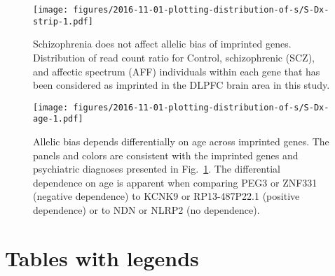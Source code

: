\documentclass[letterpaper]{article}
\begin{document}
\begin{figure}[H]
\begin{center}
\texttt{[image: figures/2016-11-01-plotting-distribution-of-s/S-Dx-strip-1.pdf]}
\caption{
Schizophrenia does not affect allelic bias of imprinted genes.
Distribution of read count ratio for Control, schizophrenic (SCZ), and
affectic spectrum (AFF) individuals within each gene that has been considered as imprinted in the DLPFC
brain area in this study.
}
\label{fig:S-Dx}
\end{center}
\end{figure}

\begin{figure}[H]
\begin{center}
\texttt{[image: figures/2016-11-01-plotting-distribution-of-s/S-Dx-age-1.pdf]}
\caption{
Allelic bias depends differentially on age across imprinted genes.
The panels and colors are consistent with the imprinted genes and psychiatric diagnoses
presented in Fig.~\ref{fig:S-Dx}.  The differential dependence on age is apparent
when comparing PEG3 or ZNF331 (negative dependence) to KCNK9 or RP13-487P22.1
(positive dependence) or to NDN or NLRP2 (no dependence).
}
\label{fig:S-age}
\end{center}
\end{figure}

\clearpage

\section{Tables with legends}
\end{document}
